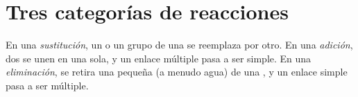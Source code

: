 \section{Tres categorías de reacciones}

\begin{definition}\label{def:g12:curly-arrows:categories}
En una \emph{sustitución}, un  o un grupo de una
 se reemplaza por otro. En una \emph{adición}, dos
 se unen en una sola, y un enlace múltiple pasa a ser simple. En
una \emph{eliminación}, se retira una  pequeña
(a menudo agua) de una , y un enlace simple pasa a ser múltiple.
\end{definition}

